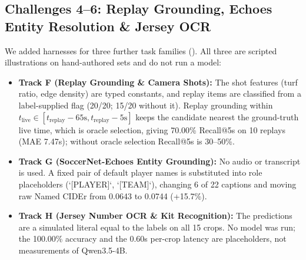 \documentclass[10pt,twocolumn,letterpaper]{article}
\begin{document}
\begin{table}[h]
\centering
\small
\caption{\textbf{Track E BAS scripted calibration illustration ($N=16$ hand-authored events; precision reported as mAP@1; not a model measurement).}}
\label{tab:bas_results}
\end{table}

\subsection{Challenges 4--6: Replay Grounding, Echoes Entity Resolution \& Jersey OCR}
We added harnesses for three further task families (). All three are scripted illustrations on hand-authored sets and do not run a model:
\begin{itemize}
    \item \textbf{Track F (Replay Grounding \& Camera Shots):} The shot features (turf ratio, edge density) are typed constants, and replay items are classified from a label-supplied flag (20/20; 15/20 without it). Replay grounding within $t_{\text{live}} \in [t_{\text{replay}}-65\text{s}, t_{\text{replay}}-5\text{s}]$ keeps the candidate nearest the ground-truth live time, which is oracle selection, giving 70.00\% Recall@5s on 10 replays (MAE 7.47s); without oracle selection Recall@5s is 30--50\%.
    \item \textbf{Track G (SoccerNet-Echoes Entity Grounding):} No audio or transcript is used. A fixed pair of default player names is substituted into role placeholders (`[PLAYER]`, `[TEAM]`), changing 6 of 22 captions and moving raw Named CIDEr from 0.0643 to 0.0744 (+15.7\%).
    \item \textbf{Track H (Jersey Number OCR \& Kit Recognition):} The predictions are a simulated literal equal to the labels on all 15 crops. No model was run; the 100.00\% accuracy and the 0.60s per-crop latency are placeholders, not measurements of Qwen3.5-4B.
\end{itemize}
\end{document}

